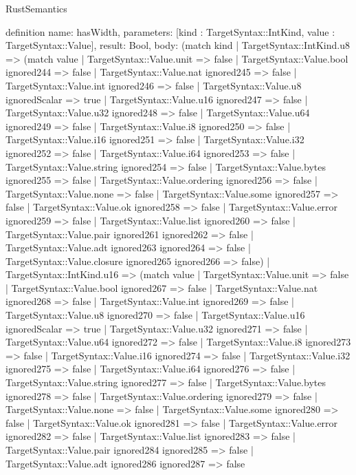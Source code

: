 \begin{lexlean}{RustSemantics}
\begin{semanticmodule}
definition{
  name: hasWidth,
  parameters: [kind : TargetSyntax::IntKind, value : TargetSyntax::Value],
  result: Bool,
  body: (match kind
    | TargetSyntax::IntKind.u8 => (match value
      | TargetSyntax::Value.unit => false
      | TargetSyntax::Value.bool ignored244 => false
      | TargetSyntax::Value.nat ignored245 => false
      | TargetSyntax::Value.int ignored246 => false
      | TargetSyntax::Value.u8 ignoredScalar => true
      | TargetSyntax::Value.u16 ignored247 => false
      | TargetSyntax::Value.u32 ignored248 => false
      | TargetSyntax::Value.u64 ignored249 => false
      | TargetSyntax::Value.i8 ignored250 => false
      | TargetSyntax::Value.i16 ignored251 => false
      | TargetSyntax::Value.i32 ignored252 => false
      | TargetSyntax::Value.i64 ignored253 => false
      | TargetSyntax::Value.string ignored254 => false
      | TargetSyntax::Value.bytes ignored255 => false
      | TargetSyntax::Value.ordering ignored256 => false
      | TargetSyntax::Value.none => false
      | TargetSyntax::Value.some ignored257 => false
      | TargetSyntax::Value.ok ignored258 => false
      | TargetSyntax::Value.error ignored259 => false
      | TargetSyntax::Value.list ignored260 => false
      | TargetSyntax::Value.pair ignored261 ignored262 => false
      | TargetSyntax::Value.adt ignored263 ignored264 => false
      | TargetSyntax::Value.closure ignored265 ignored266 => false)
    | TargetSyntax::IntKind.u16 => (match value
      | TargetSyntax::Value.unit => false
      | TargetSyntax::Value.bool ignored267 => false
      | TargetSyntax::Value.nat ignored268 => false
      | TargetSyntax::Value.int ignored269 => false
      | TargetSyntax::Value.u8 ignored270 => false
      | TargetSyntax::Value.u16 ignoredScalar => true
      | TargetSyntax::Value.u32 ignored271 => false
      | TargetSyntax::Value.u64 ignored272 => false
      | TargetSyntax::Value.i8 ignored273 => false
      | TargetSyntax::Value.i16 ignored274 => false
      | TargetSyntax::Value.i32 ignored275 => false
      | TargetSyntax::Value.i64 ignored276 => false
      | TargetSyntax::Value.string ignored277 => false
      | TargetSyntax::Value.bytes ignored278 => false
      | TargetSyntax::Value.ordering ignored279 => false
      | TargetSyntax::Value.none => false
      | TargetSyntax::Value.some ignored280 => false
      | TargetSyntax::Value.ok ignored281 => false
      | TargetSyntax::Value.error ignored282 => false
      | TargetSyntax::Value.list ignored283 => false
      | TargetSyntax::Value.pair ignored284 ignored285 => false
      | TargetSyntax::Value.adt ignored286 ignored287 => false
}
\end{semanticmodule}
\end{lexlean}
